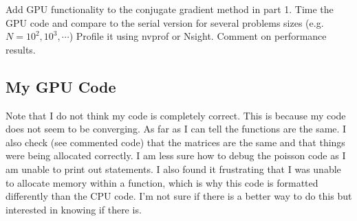 \documentclass{article}
\begin{document}
Add GPU functionality to the conjugate gradient method in part 1. Time the GPU
code and compare to the serial version for several problems sizes (e.g. $N =
10^2,10^3,\cdots$) Profile it using nvprof or Nsight. Comment on performance
results.

\subsection{My GPU Code}
Note that I do not think my code is completely correct. This is because my code
does not seem to be converging. As far as I can tell the functions are the same.
I also check (see commented code) that the matrices are the same and that things
were being allocated correctly. I am less sure how to debug the poisson code as
I am unable to print out statements. I also found it frustrating that I was
unable to allocate memory within a function, which is why this code is formatted
differently than the CPU code. I'm not sure if there is a better way to do this
but interested in knowing if there is. 
\end{document}
